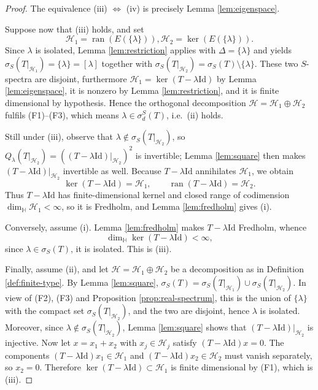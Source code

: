 \documentclass[12pt,a4paper]{article}
\theoremstyle{plain}
\theoremstyle{definition}
\theoremstyle{remark}
\newcommand{\HH}{\mathbb H}
\newcommand{\Id}{\mathrm{Id}}
\newcommand{\HS}{\mathcal H}
\newcommand{\dimH}{\dim_{\HH}}
\newcommand{\sigS}{\sigma_S}
\newcommand{\sigdS}{\sigma_{d}^{S}}
\DeclareMathOperator{\ran}{ran}
\begin{document}
{\begin{proof}
The equivalence (iii) $\Leftrightarrow$ (iv) is precisely Lemma
\ref{lem:eigenspace}.

Suppose now that (iii) holds, and set
$$\HS_1=\ran(E(\{\lambda\})), \HS_2=\ker(E(\{\lambda\})).$$ Since
$\lambda$ is isolated, Lemma \ref{lem:restriction} applies with
$\Delta=\{\lambda\}$ and yields
$\sigS(T|_{\HS_1})=\{\lambda\}=[\lambda]$ together with
$\sigS(T|_{\HS_2})=\sigS(T)\setminus\{\lambda\}$. These two $S$-spectra
are disjoint, furthermore $\HS_1=\ker(T-\lambda\Id)$ by Lemma
\ref{lem:eigenspace}, it is nonzero by Lemma \ref{lem:restriction},
and it is finite dimensional by hypothesis. Hence the orthogonal
decomposition $\HS=\HS_1\oplus\HS_2$ fulfils (F1)--(F3), which means
$\lambda\in\sigdS(T)$, i.e.\ (ii) holds.

Still under (iii), observe that
$\lambda\notin\sigS(T|_{\HS_2})$, so
$Q_\lambda(T|_{\HS_2})=((T-\lambda\Id)|_{\HS_2})^2$ is invertible;
Lemma \ref{lem:square} then makes $(T-\lambda\Id)|_{\HS_2}$
invertible as well. Because $T-\lambda\Id$ annihilates $\HS_1$, we
obtain
\[
 \ker(T-\lambda\Id)=\HS_1,
 \qquad
 \ran(T-\lambda\Id)=\HS_2 .
\]
Thus $T-\lambda\Id$ has finite-dimensional kernel and closed range of
codimension $\dimH\HS_1<\infty$, so it is Fredholm, and Lemma
\ref{lem:fredholm} gives (i).

Conversely, assume (i). Lemma \ref{lem:fredholm} makes
$T-\lambda\Id$ Fredholm, whence $$\dimH\ker(T-\lambda\Id)<\infty,$$
since $\lambda\in\sigS(T)$, it is isolated. This is (iii).

Finally, assume (ii), and let $\HS=\HS_1\oplus\HS_2$ be a
decomposition as in Definition \ref{def:finite-type}. By Lemma
\ref{lem:square},
$\sigS(T)=\sigS(T|_{\HS_1})\cup\sigS(T|_{\HS_2})$. In view of (F2),
(F3) and Proposition \ref{prop:real-spectrum}, this is the union of
$\{\lambda\}$ with the compact set $\sigS(T|_{\HS_2})$, and the two
are disjoint, hence $\lambda$ is isolated. Moreover, since
$\lambda\notin\sigS(T|_{\HS_2})$, Lemma \ref{lem:square} shows that
$(T-\lambda\Id)|_{\HS_2}$ is injective. Now let $x=x_1+x_2$ with
$x_j\in\HS_j$ satisfy $(T-\lambda\Id)x=0$. The components
$(T-\lambda\Id)x_1\in\HS_1$ and $(T-\lambda\Id)x_2\in\HS_2$ must
vanish separately, so $x_2=0$. Therefore
$\ker(T-\lambda\Id)\subset\HS_1$ is finite dimensional by (F1),
which is (iii).
\end{proof}




}
\end{document}
